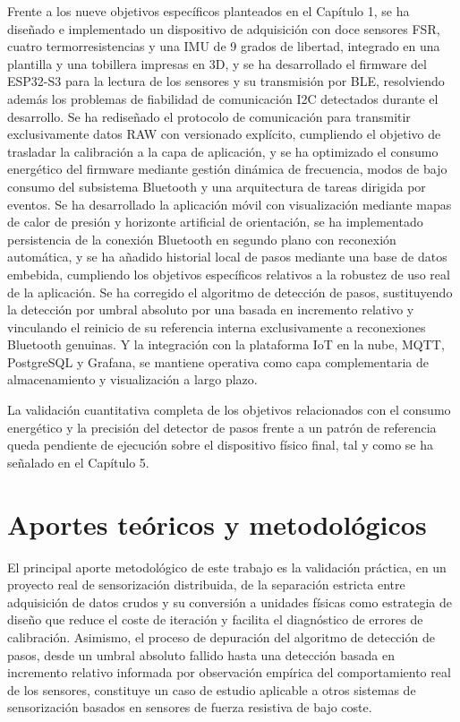 \begin{IAtext}
Frente a los nueve objetivos específicos planteados en el Capítulo 1, se ha diseñado e implementado un dispositivo de adquisición con doce sensores FSR, cuatro termorresistencias y una IMU de 9 grados de libertad, integrado en una plantilla y una tobillera impresas en 3D, y se ha desarrollado el firmware del ESP32-S3 para la lectura de los sensores y su transmisión por BLE, resolviendo además los problemas de fiabilidad de comunicación I2C detectados durante el desarrollo. Se ha rediseñado el protocolo de comunicación para transmitir exclusivamente datos RAW con versionado explícito, cumpliendo el objetivo de trasladar la calibración a la capa de aplicación, y se ha optimizado el consumo energético del firmware mediante gestión dinámica de frecuencia, modos de bajo consumo del subsistema Bluetooth y una arquitectura de tareas dirigida por eventos. Se ha desarrollado la aplicación móvil con visualización mediante mapas de calor de presión y horizonte artificial de orientación, se ha implementado persistencia de la conexión Bluetooth en segundo plano con reconexión automática, y se ha añadido historial local de pasos mediante una base de datos embebida, cumpliendo los objetivos específicos relativos a la robustez de uso real de la aplicación. Se ha corregido el algoritmo de detección de pasos, sustituyendo la detección por umbral absoluto por una basada en incremento relativo y vinculando el reinicio de su referencia interna exclusivamente a reconexiones Bluetooth genuinas. Y la integración con la plataforma IoT en la nube, MQTT, PostgreSQL y Grafana, se mantiene operativa como capa complementaria de almacenamiento y visualización a largo plazo.

La validación cuantitativa completa de los objetivos relacionados con el consumo energético y la precisión del detector de pasos frente a un patrón de referencia queda pendiente de ejecución sobre el dispositivo físico final, tal y como se ha señalado en el Capítulo 5.

\section{Aportes teóricos y metodológicos}

El principal aporte metodológico de este trabajo es la validación práctica, en un proyecto real de sensorización distribuida, de la separación estricta entre adquisición de datos crudos y su conversión a unidades físicas como estrategia de diseño que reduce el coste de iteración y facilita el diagnóstico de errores de calibración. Asimismo, el proceso de depuración del algoritmo de detección de pasos, desde un umbral absoluto fallido hasta una detección basada en incremento relativo informada por observación empírica del comportamiento real de los sensores, constituye un caso de estudio aplicable a otros sistemas de sensorización basados en sensores de fuerza resistiva de bajo coste.


\end{IAtext}
